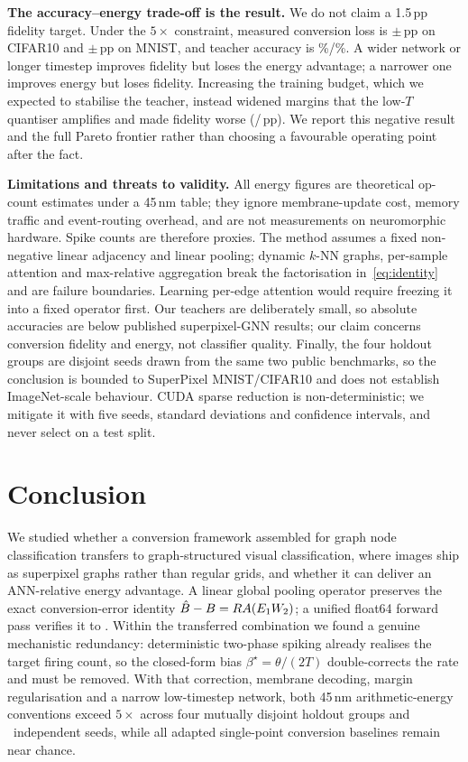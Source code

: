 \textbf{The accuracy--energy trade-off is the result.} We do not claim a 1.5\,pp fidelity target. Under the $5\times$ constraint, measured conversion loss is \CIFARLoss$\pm$\CIFARLossStd\,pp on CIFAR10 and \MNISTLoss$\pm$\MNISTLossStd\,pp on MNIST, and teacher accuracy is \CIFARAnn\%/\MNISTAnn\%. A wider network or longer timestep improves fidelity but loses the energy advantage; a narrower one improves energy but loses fidelity. Increasing the training budget, which we expected to stabilise the teacher, instead widened margins that the low-$T$ quantiser amplifies and made fidelity worse (\EIGHTEENMNISTLoss/\EIGHTEENCIFARLoss\,pp). We report this negative result and the full Pareto frontier rather than choosing a favourable operating point after the fact.

\textbf{Limitations and threats to validity.} All energy figures are theoretical op-count estimates under a 45\,nm table; they ignore membrane-update cost, memory traffic and event-routing overhead, and are not measurements on neuromorphic hardware. Spike counts are therefore proxies. The method assumes a fixed non-negative linear adjacency and linear pooling; dynamic $k$-NN graphs, per-sample attention and max-relative aggregation break the factorisation in~\eqref{eq:identity} and are failure boundaries. Learning per-edge attention would require freezing it into a fixed operator first. Our teachers are deliberately small, so absolute accuracies are below published superpixel-GNN results; our claim concerns conversion fidelity and energy, not classifier quality. Finally, the four holdout groups are disjoint seeds drawn from the same two public benchmarks, so the conclusion is bounded to SuperPixel MNIST/CIFAR10 and does not establish ImageNet-scale behaviour. CUDA sparse reduction is non-deterministic; we mitigate it with five seeds, standard deviations and confidence intervals, and never select on a test split.

\section{Conclusion}
\label{sec:conclusion}

We studied whether a conversion framework assembled for graph node classification transfers to graph-structured visual classification, where images ship as superpixel graphs rather than regular grids, and whether it can deliver an ANN-relative energy advantage. A linear global pooling operator preserves the exact conversion-error identity $\hat{B}-B=R A(E_1W_2)$; a unified float64 forward pass verifies it to \IdentityMax. Within the transferred combination we found a genuine mechanistic redundancy: deterministic two-phase spiking already realises the target firing count, so the closed-form bias $\beta^\star=\theta/(2T)$ double-corrects the rate and must be removed. With that correction, membrane decoding, margin regularisation and a narrow low-timestep network, both 45\,nm arithmetic-energy conventions exceed $5\times$ across four mutually disjoint holdout groups and \TotalSeeds\ independent seeds, while all adapted single-point conversion baselines remain near chance.

